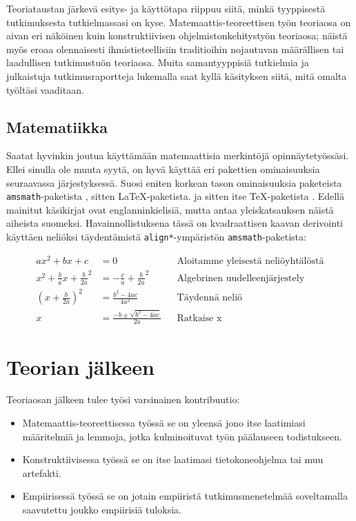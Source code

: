 \documentclass[utf8]{gradu3}
\begin{document}
Teoriataustan järkevä esitys- ja käyttötapa riippuu siitä, minkä
tyyppisestä tutkimuksesta tutkielmassasi on kyse.
Matemaattis-teoreettisen työn teoriaosa on aivan eri näköinen kuin
konstruktiivisen ohjelmistonkehitystyön teoriaosa; näistä myös eroaa
olennaisesti ihmistieteellisiin traditioihin nojautuvan määrällisen
tai laadullisen tutkimustuön teoriaosa.  Muita samantyyppisiä
tutkielmia ja julkaistuja tutkimusraportteja lukemalla saat kyllä
käsityksen siitä, mitä omalta työltäsi vaaditaan.

\subsection{Matematiikka}

Saatat hyvinkin joutua käyttämään matemaattisia merkintöjä opinnäytetyössäsi.
Ellei sinulla ole muuta syytä, on hyvä käyttää eri pakettien
ominaisuuksia seuraavassa järjestyksessä. Suosi eniten korkean tason
ominaisuuksia paketeista \texttt{amsmath}-paketista
\parencite[katso][]{amsmath-manual}, sitten \LaTeX-paketista.
\parencite[katso][]{lamport94:_latex} ja sitten itse \TeX-paketista
\parencite[katso][]{knuth86:_texbook}. Edellä mainitut käsikirjat ovat
englanninkielisiä, mutta  antaa
yleiskatsauksen näistä aiheista suomeksi. Havainnollistuksena tässä on
kvadraattisen kaavan derivointi käyttäen neliöksi täydentämistä
\texttt{align*}-ympäristön \texttt{amsmath}-paketista:

\begin{align*}
  ax^2 + bx + c &= 0 && \text{Aloitamme yleisestä neliöyhtälöstä} \\
  x^2 + \frac{b}{a}x + \frac{b}{2a}^2 &= -\frac{c}{a} + \frac{b}{2a}^2 && \text{Algebrinen uudelleenjärjestely} \\
  \left(x + \frac{b}{2a}\right)^2 &= \frac{b^2 - 4ac}{4a^2} && \text{Täydennä neliö} \\
  x &= \frac{-b \pm \sqrt{b^2 - 4ac}}{2a} && \text{Ratkaise x}
\end{align*}

\section{Teorian jälkeen}

Teoriaosan jälkeen tulee työsi varsinainen kontribuutio:
\begin{itemize}
\item Matemaattis-teoreettisessa työssä se on yleensä jono itse
  laatimiasi määritelmiä ja lemmoja, jotka kulminoituvat työn
  päälauseen todistukseen.
\item Konstruktiivisessa työssä se on itse laatimasi tietokoneohjelma
  tai muu artefakti.
\item Empiirisessä työssä se on jotain empiiristä tutkimusmenetelmää
  soveltamalla saavutettu joukko empiirisiä tuloksia.
\end{itemize}
\end{document}
